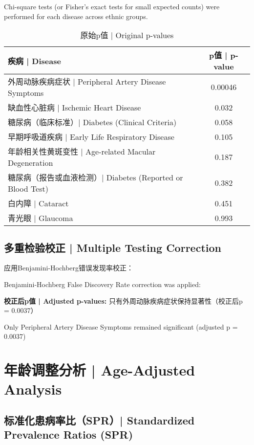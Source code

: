 \documentclass[12pt,a4paper]{article}
\begin{document}
Chi-square tests (or Fisher's exact tests for small expected counts) were performed for each disease across ethnic groups.

\begin{table}[H]
\centering
\caption{原始p值 | Original p-values}
\begin{tabular}{@{}lc@{}}
\toprule
\textbf{疾病 | Disease} & \textbf{p值 | p-value} \\
\midrule
外周动脉疾病症状 | Peripheral Artery Disease Symptoms & 0.00046 \\
缺血性心脏病 | Ischemic Heart Disease & 0.032 \\
糖尿病（临床标准）| Diabetes (Clinical Criteria) & 0.058 \\
早期呼吸道疾病 | Early Life Respiratory Disease & 0.105 \\
年龄相关性黄斑变性 | Age-related Macular Degeneration & 0.187 \\
糖尿病（报告或血液检测）| Diabetes (Reported or Blood Test) & 0.382 \\
白内障 | Cataract & 0.451 \\
青光眼 | Glaucoma & 0.993 \\
\bottomrule
\end{tabular}
\end{table}

\subsection{多重检验校正 | Multiple Testing Correction}

应用Benjamini-Hochberg错误发现率校正：

Benjamini-Hochberg False Discovery Rate correction was applied:

\colorbox{cyan!20}{\parbox{\textwidth}{
\textbf{校正后p值 | Adjusted p-values:} 只有外周动脉疾病症状保持显著性（校正后p = 0.0037）

Only Peripheral Artery Disease Symptoms remained significant (adjusted p = 0.0037)
}}

\section{年龄调整分析 | Age-Adjusted Analysis}

\subsection{标准化患病率比（SPR）| Standardized Prevalence Ratios (SPR)}
\end{document}
